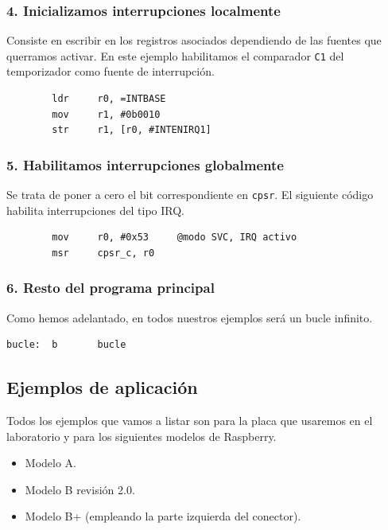 \subsubsection{4. Inicializamos interrupciones localmente}

Consiste en escribir en los registros asociados dependiendo de las fuentes que querramos
activar. En este ejemplo habilitamos el comparador
{\tt C1} del temporizador como fuente de interrupción.

\begin{lstlisting}
        ldr     r0, =INTBASE
        mov     r1, #0b0010
        str     r1, [r0, #INTENIRQ1]
\end{lstlisting}

\subsubsection{5. Habilitamos interrupciones globalmente}

Se trata de poner a cero el bit correspondiente en {\tt cpsr}. El siguiente código habilita
interrupciones del tipo IRQ.

\begin{lstlisting}
        mov     r0, #0x53     @modo SVC, IRQ activo
        msr     cpsr_c, r0
\end{lstlisting}

\subsubsection{6. Resto del programa principal}

Como hemos adelantado, en todos nuestros ejemplos será un bucle infinito.

\begin{lstlisting}
bucle:  b       bucle
\end{lstlisting}


\subsection{Ejemplos de aplicación}

Todos los ejemplos que vamos a listar son para la placa que usaremos en el laboratorio
y para los siguientes modelos de Raspberry.

\begin{itemize}
  \item Modelo A.
  \item Modelo B revisión 2.0.
  \item Modelo B+ (empleando la parte izquierda del conector).
\end{itemize}


